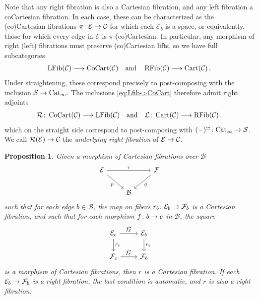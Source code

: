 \documentclass[10pt]{amsart}
\numberwithin{equation}{section}
\newtheorem{prop}{Proposition}[subsection]
\theoremstyle{definition}
\DeclareMathOperator{\CoCart}{CoCart}
\DeclareMathOperator{\Cart}{Cart}
\DeclareMathOperator{\RFib}{RFib}
\DeclareMathOperator{\LFib}{LFib}
\newcommand{\Cat}{\mathrm{Cat}\vphantom{t}}
\newcommand{\cB}{\mathcal{B}}
\newcommand{\cC}{\mathcal{C}}
\newcommand{\cE}{\mathcal{E}}
\newcommand{\cS}{\mathcal{S}}
\newcommand{\cL}{\mathcal{L}}
\newcommand{\cR}{\mathcal{R}}
\newcommand{\cF}{\mathcal{F}}
\renewcommand{\to}{\mathchoice{\longrightarrow}{\rightarrow}{}{}}
\begin{document}
	Note that any right fibration is also a Cartesian fibration, and any left fibration a coCartesian fibration.
  In each case, these can be characterized as the (co)Cartesian fibrations $\pi\colon \cE\to \cC$ for which each $\cE_{b}$ is a space, or equivalently, those for which every edge in $\cE$ is $\pi$-(co)Cartesian.
  In particular, any morphism of right (left) fibrations must preserve (co)Cartesian lifts, so we have full subcategories
	\begin{align}\label{eq:Lfib->CoCart}
		\LFib(\cC) \to \CoCart(\cC) \quad \text{and} \quad \RFib(\cC) \to \Cart(\cC) \,.
	\end{align}
	Under straightening, these correspond precisely to post-composing with the inclusion $\cS\to \Cat_{\infty}$.
  The inclusions \eqref{eq:Lfib->CoCart} therefore admit right adjoints
	\begin{align*}
		\cR \colon \CoCart(\cC)\to \LFib(\cC) \quad \text{and} \quad  \cL\colon \Cart(\cC) \to \RFib(\cC) \,.
	\end{align*}
	which on the straight side correspond to post-composing with $(-)^{\simeq}\colon \Cat_{\infty}\to \cS$.
  We call $\cR(\cE)\to \cC$ the \emph{underlying right fibration} of $\cE\to \cC$.
	\begin{prop}\label{thm:iterated_fibration}
		Given a morphism of Cartesian fibrations over $\cB$
		\begin{equation*}
			\begin{tikzcd}
				\cE \arrow[rr, "r"] \arrow[dr, "p"'] & & \cF \arrow[dl, "q"] \\
				& \cB &
			\end{tikzcd}
		\end{equation*}
		such that for each edge $b\in \cB$, the map on fibers $r_{b}\colon \cE_{b} \to \cF_{b}$ is a Cartesian fibration, and such that for each morphism $f\colon b\to c$ in $\cB$, the square
		\begin{equation*}
			\begin{tikzcd}
				\cE_{c} \arrow[r, "f^{*}_{\cE}"] \arrow[d, "r_{c}"]      &   \cE_{b}  \arrow[d, "r_{b}"] \\
				\cF_{c}  \arrow[r, "f^{*}_{\cE}"]               &   \cF_{b}
			\end{tikzcd}
		\end{equation*}
		is a morphism of Cartesian fibrations, then $r$ is a Cartesian fibration.
    If each $\cE_{b}\to \cF_{b}$ is a right fibration, the last condition is automatic, and $r$ is also a right fibration.
	\end{prop}
\end{document}
